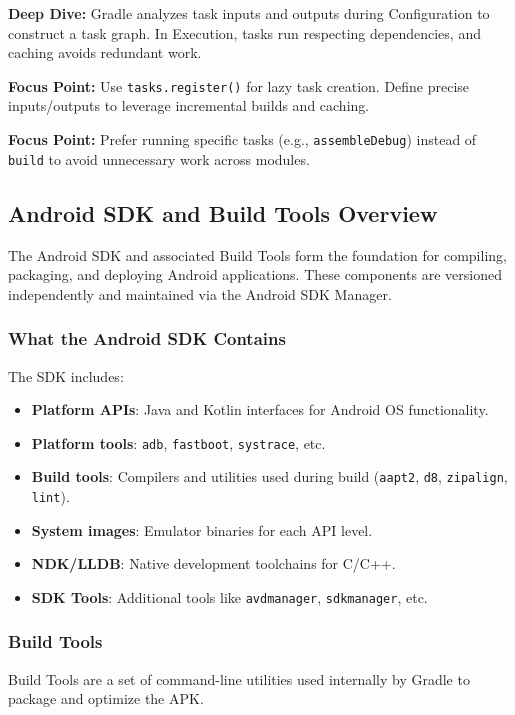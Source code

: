 \documentclass[a4paper,12pt]{article}
\begin{document}
\textbf{Deep Dive:} Gradle analyzes task inputs and outputs during Configuration to construct a task graph. In Execution, tasks run respecting dependencies, and caching avoids redundant work.

\textbf{Focus Point:} Use \texttt{tasks.register()} for lazy task creation. Define precise inputs/outputs to leverage incremental builds and caching.

\textbf{Focus Point:} Prefer running specific tasks (e.g., \texttt{assembleDebug}) instead of \texttt{build} to avoid unnecessary work across modules.

\subsection{Android SDK and Build Tools Overview}

The Android SDK and associated Build Tools form the foundation for compiling, packaging, and deploying Android applications. These components are versioned independently and maintained via the Android SDK Manager.

\subsubsection{What the Android SDK Contains}

The SDK includes:

\begin{itemize}
  \item \textbf{Platform APIs}: Java and Kotlin interfaces for Android OS functionality.
  \item \textbf{Platform tools}: \texttt{adb}, \texttt{fastboot}, \texttt{systrace}, etc.
  \item \textbf{Build tools}: Compilers and utilities used during build (\texttt{aapt2}, \texttt{d8}, \texttt{zipalign}, \texttt{lint}).
  \item \textbf{System images}: Emulator binaries for each API level.
  \item \textbf{NDK/LLDB}: Native development toolchains for C/C++.
  \item \textbf{SDK Tools}: Additional tools like \texttt{avdmanager}, \texttt{sdkmanager}, etc.
\end{itemize}

\subsubsection{Build Tools}

Build Tools are a set of command-line utilities used internally by Gradle to package and optimize the APK.
\end{document}
